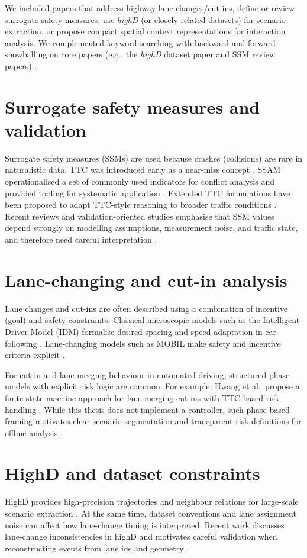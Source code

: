 \documentclass[12pt,a4paper,twoside,openright]{report}
\begin{document}
    We included papers that address highway lane changes/cut-ins, define or review surrogate safety measures, use \textit{highD} (or closely related datasets) for scenario extraction, or propose compact spatial context representations for interaction analysis. We complemented keyword searching with backward and forward snowballing on core papers (e.g., the \textit{highD} dataset paper and SSM review papers) \cite{wohlin2014}.

    \section{Surrogate safety measures and validation}
    Surrogate safety measures (SSMs) are used because crashes (collisions) are rare in naturalistic data. TTC was introduced early as a near-miss concept \cite{hayward1972}. SSAM operationalised a set of commonly used indicators for conflict analysis and provided tooling for systematic application \cite{ssam2008}. Extended TTC formulations have been proposed to adapt TTC-style reasoning to broader traffic conditions \cite{minderhoud2001}. Recent reviews and validation-oriented studies emphasise that SSM values depend strongly on modelling assumptions, measurement noise, and traffic state, and therefore need careful interpretation \cite{wang2021ssm,johnsson2021validation}.

    \section{Lane-changing and cut-in analysis}
    Lane changes and cut-ins are often described using a combination of incentive (goal) and safety constraints. Classical microscopic models such as the Intelligent Driver Model (IDM) formalise desired spacing and speed adaptation in car-following \cite{treiber2000idm}. Lane-changing models such as MOBIL make safety and incentive criteria explicit \cite{kesting2007mobil}.

    For cut-in and lane-merging behaviour in automated driving, structured phase models with explicit risk logic are common. For example, Hwang et al.\ propose a finite-state-machine approach for lane-merging cut-ins with TTC-based risk handling \cite{hwang2022fsmrl}. While this thesis does not implement a controller, such phase-based framing motivates clear scenario segmentation and transparent risk definitions for offline analysis.

    \section{HighD and dataset constraints}
    HighD provides high-precision trajectories and neighbour relations for large-scale scenario extraction \cite{highd_2018}. At the same time, dataset conventions and lane assignment noise can affect how lane-change timing is interpreted. Recent work discusses lane-change inconsistencies in highD and motivates careful validation when reconstructing events from lane ids and geometry \cite{wanggao2025highd}.
\end{document}
